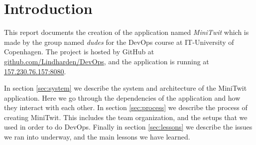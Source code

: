\section{Introduction}

This report documents the creation of the application named \textit{MiniTwit} which is made by the group named \textit{dudes} for the DevOps course at IT-University of Copenhagen. The project is hosted by GitHub at \href{https://github.com/Lindharden/DevOps}{github.com/Lindharden/DevOps}, and the application is running at \href{http://157.230.76.157:8080}{157.230.76.157:8080}.

In section \ref{sec:system} we describe the system and architecture of the MiniTwit application. Here we go through the dependencies of the application and how they interact with each other. In section \ref{sec:process} we describe the process of creating MiniTwit. This includes the team organization, and the setups that we used in order to do DevOps. Finally in section \ref{sec:lessons} we describe the issues we ran into underway, and the main lessons we have learned.
